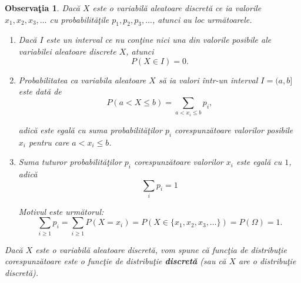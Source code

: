 \documentclass{article}
\begin{document}
\newtheorem{obs}{Observaţia}[section]

\begin{obs}
	Dacă $X$ este o variabilă aleatoare discretă ce ia valorile $x_1, x_2, x_3, \dots$ cu probabilităţile $p_1, p_2, p_3, \dots$, atunci au loc următoarele.

	\begin{enumerate}
		\item Dacă $I$ este un interval ce nu conţine nici una din valorile posibile ale variabilei aleatoare discrete $X$, atunci
			\begin{equation}
				P(X \in I) = 0.
			\end{equation}

		\item Probabilitatea ca variabila aleatoare $X$ să ia valori într-un interval $I = (a,b]$ este dată de
			\begin{equation}
				P(a < X \leq b) = \sum_{a < x_i \leq b} p_i,
			\end{equation}

		adică este egală cu suma probabilităţilor $p_i$ corespunzătoare valorilor posibile $x_i$ pentru care $a < x_i \leq b$.

	\item Suma tuturor probabilităţilor $p_i$ corespunzătoare valorilor $x_i$ este egală cu $1$, adică
		\begin{equation}
			\sum_i p_i = 1
		\end{equation}

		Motivul este următorul:
		$$
			\sum_{i \geq 1} p_i = \sum_{i \geq 1} P(X = x_i) = P(X \in \{x_1, x_2, x_3, \dots\}) = P(\Omega) = 1.
		$$
	\end{enumerate}

	Dacă $X$ este o variabilă aleatoare discretă, vom spune că funcţia de distribuţie corespunzătoare este o funcţie de distribuţie \textbf{discretă} (sau că $X$ are o distribuţie discretă).
\end{obs}
\end{document}
